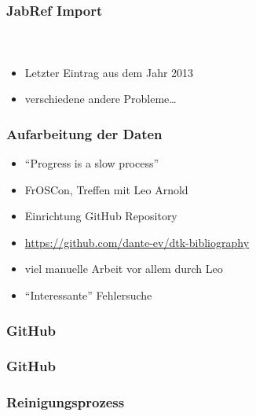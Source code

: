 \documentclass[ngerman]{beamer}
\begin{document}
\begin{frame}
\frametitle{JabRef Import}
\framesubtitle{~}

\begin{itemize}
	\item Letzter Eintrag aus dem Jahr 2013
	\item verschiedene andere Probleme\ldots
\end{itemize}

\begin{center}
\end{center}

\end{frame}

\begin{frame}
\frametitle{Aufarbeitung der Daten}

\begin{itemize}
\item \enquote{Progress is a slow process}
\item FrOSCon, Treffen mit Leo Arnold
\item Einrichtung GitHub Repository
\item \url{https://github.com/dante-ev/dtk-bibliography}
\item viel manuelle Arbeit vor allem durch Leo
\item \enquote{Interessante} Fehlersuche
\end{itemize}
\end{frame}

\begin{frame}
\frametitle{GitHub}

\begin{center}
\end{center}
\end{frame}

\begin{frame}
\frametitle{GitHub}

\begin{center}
\end{center}
\end{frame}

\begin{frame}[fragile]
\frametitle{Reinigungsprozess}

\begin{center}
\end{center}

\end{frame}
\end{document}
